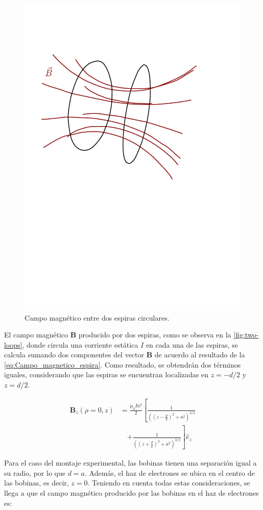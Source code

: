 \begin{figure}[htbp!]
  \centering
  \includegraphics[width=0.6\linewidth]{./images/coils-field.pdf}
  \caption{Campo magnético entre dos espiras circulares.}
  \label{fig:coils-field}
\end{figure}

El campo magnético $\mathbf{B}$ producido por dos espiras, como se observa en la
\cref{fig:two-loops}, donde circula una corriente estática $I$ en cada una de
las espiras, se calcula sumando dos componentes del vector $\mathbf{B}$ de
acuerdo al resultado de la \cref{eq:Campo_magnetico_espira}.
Como resultado, se obtendrán dos términos iguales, considerando que las espiras
se encuentran localizadas en \(z = -d/2\) y \(z = d/2\).

\begin{equation}
  \begin{aligned}
    \mathbf{B}_{z}(\rho=0,z) &= \frac{\mu_{0} I a^{2}}{2} \left[ \frac{1}{\left((z-\frac{d}{2})^{2} + a^{2}\right)^{3/2}} \right.\\
                             &\quad \left.+ \frac{1}{\left((z+\frac{d}{2})^{2} + a^{2}\right)^{3/2}} \right] \hat{e}_{z}
                             \label{Campo_magnetico_2espiras}
  \end{aligned}
\end{equation}

Para el caso del montaje experimental, las bobinas tienen una separación igual a
su radio, por lo que \( d = a \).
Además, el haz de electrones se ubica en el centro de las bobinas, es decir,
\( z = 0 \). Teniendo en cuenta todas estas consideraciones, se llega a que el
campo magnético producido por las bobinas en el haz de electrones es:

